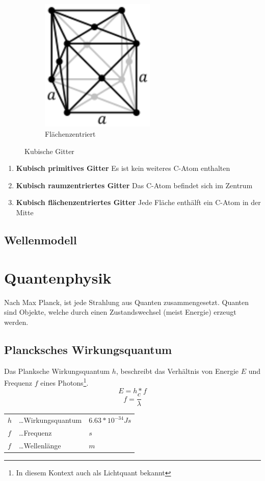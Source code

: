 \documentclass{school}
\begin{document}
\begin{figure}[!ht]
\begin{subfigure}[!ht]{0.2\textwidth}
        \includegraphics[width=0.6\textwidth]{cubic-face-centered.png}
        \caption[https://de.wikipedia.org/wiki/Bravais-Gitter]{Flächenzentriert}
    \end{subfigure}
    \caption[https://de.wikipedia.org/wiki/Bravais-Gitter]{Kubische Gitter}
\end{figure}

\begin{enumerate}[label= (\alph*)]
    \item \textbf{Kubisch primitives Gitter} Es ist kein weiteres C-Atom enthalten
    \item \textbf{Kubisch raumzentriertes Gitter} Das C-Atom befindet sich im Zentrum
    \item \textbf{Kubisch flächenzentriertes Gitter} Jede Fläche enthälft ein C-Atom in der Mitte
\end{enumerate}
\subsection{Wellenmodell}

\section{Quantenphysik}
Nach Max Planck, ist jede Strahlung aus Quanten zusammengesetzt. Quanten sind Objekte, welche durch einen Zustandswechsel (meist Energie) erzeugt werden.

\subsection{Plancksches Wirkungsquantum}
Das Planksche Wirkungsquantum $h$, beschreibt das Verhältnis von Energie $E$ und Frequenz $f$ eines Photons\footnote{In diesem Kontext auch als Lichtquant bekannt}.
$$E = h * f$$
$$f = \frac{c}{\lambda}$$
\begin{center}
    \begin{tabular}{l l l}
        $h$ &\dots Wirkungsquantum & $6.63 * 10^{-34} Js$\\
        $f$ &\dots Frequenz & ${s}$\\
        $f$ &\dots Wellenlänge & ${m}$
    \end{tabular}
\end{center}
\end{document}
